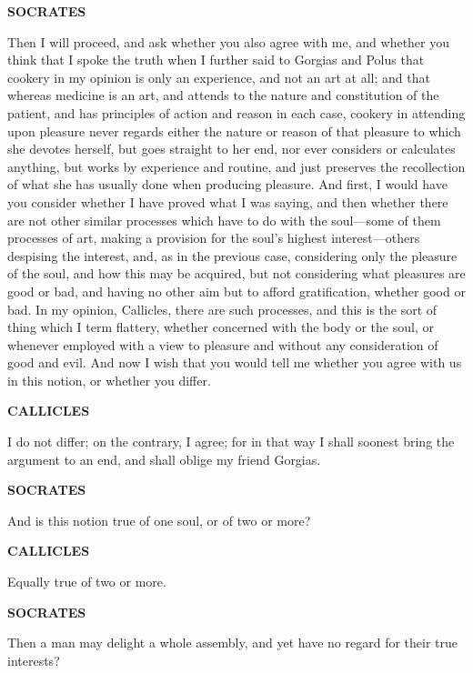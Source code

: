 \documentclass[11pt,letter]{article}
\begin{document}
\par \textbf{SOCRATES}
\par   Then I will proceed, and ask whether you also agree with me, and whether you think that I spoke the truth when I further said to Gorgias and Polus that cookery in my opinion is only an experience, and not an art at all; and that whereas medicine is an art, and attends to the nature and constitution of the patient, and has principles of action and reason in each case, cookery in attending upon pleasure never regards either the nature or reason of that pleasure to which she devotes herself, but goes straight to her end, nor ever considers or calculates anything, but works by experience and routine, and just preserves the recollection of what she has usually done when producing pleasure. And first, I would have you consider whether I have proved what I was saying, and then whether there are not other similar processes which have to do with the soul—some of them processes of art, making a provision for the soul’s highest interest—others despising the interest, and, as in the previous case, considering only the pleasure of the soul, and how this may be acquired, but not considering what pleasures are good or bad, and having no other aim but to afford gratification, whether good or bad. In my opinion, Callicles, there are such processes, and this is the sort of thing which I term flattery, whether concerned with the body or the soul, or whenever employed with a view to pleasure and without any consideration of good and evil. And now I wish that you would tell me whether you agree with us in this notion, or whether you differ.

\par \textbf{CALLICLES}
\par   I do not differ; on the contrary, I agree; for in that way I shall soonest bring the argument to an end, and shall oblige my friend Gorgias.

\par \textbf{SOCRATES}
\par   And is this notion true of one soul, or of two or more?

\par \textbf{CALLICLES}
\par   Equally true of two or more.

\par \textbf{SOCRATES}
\par   Then a man may delight a whole assembly, and yet have no regard for their true interests?
\end{document}
